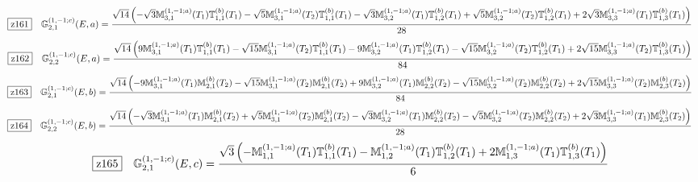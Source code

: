 \documentclass[fleqn,10pt,landscape]{jsarticle}
\begin{document}
\begin{dmath*}
\hspace*{3mm}\fbox{z161}\quad \mathbb{G}_{2,1}^{(1,-1;c)}(E,a)=\frac{\sqrt{14} \left(- \sqrt{3} \mathbb{M}_{3,1}^{(1,-1;a)}(T_{1}) \mathbb{T}_{1,1}^{(b)}(T_{1}) - \sqrt{5} \mathbb{M}_{3,1}^{(1,-1;a)}(T_{2}) \mathbb{T}_{1,1}^{(b)}(T_{1}) - \sqrt{3} \mathbb{M}_{3,2}^{(1,-1;a)}(T_{1}) \mathbb{T}_{1,2}^{(b)}(T_{1}) + \sqrt{5} \mathbb{M}_{3,2}^{(1,-1;a)}(T_{2}) \mathbb{T}_{1,2}^{(b)}(T_{1}) + 2 \sqrt{3} \mathbb{M}_{3,3}^{(1,-1;a)}(T_{1}) \mathbb{T}_{1,3}^{(b)}(T_{1})\right)}{28}
\end{dmath*}
\begin{dmath*}
\hspace*{3mm}\fbox{z162}\quad \mathbb{G}_{2,2}^{(1,-1;c)}(E,a)=\frac{\sqrt{14} \left(9 \mathbb{M}_{3,1}^{(1,-1;a)}(T_{1}) \mathbb{T}_{1,1}^{(b)}(T_{1}) - \sqrt{15} \mathbb{M}_{3,1}^{(1,-1;a)}(T_{2}) \mathbb{T}_{1,1}^{(b)}(T_{1}) - 9 \mathbb{M}_{3,2}^{(1,-1;a)}(T_{1}) \mathbb{T}_{1,2}^{(b)}(T_{1}) - \sqrt{15} \mathbb{M}_{3,2}^{(1,-1;a)}(T_{2}) \mathbb{T}_{1,2}^{(b)}(T_{1}) + 2 \sqrt{15} \mathbb{M}_{3,3}^{(1,-1;a)}(T_{2}) \mathbb{T}_{1,3}^{(b)}(T_{1})\right)}{84}
\end{dmath*}
\begin{dmath*}
\hspace*{3mm}\fbox{z163}\quad \mathbb{G}_{2,1}^{(1,-1;c)}(E,b)=\frac{\sqrt{14} \left(- 9 \mathbb{M}_{3,1}^{(1,-1;a)}(T_{1}) \mathbb{M}_{2,1}^{(b)}(T_{2}) - \sqrt{15} \mathbb{M}_{3,1}^{(1,-1;a)}(T_{2}) \mathbb{M}_{2,1}^{(b)}(T_{2}) + 9 \mathbb{M}_{3,2}^{(1,-1;a)}(T_{1}) \mathbb{M}_{2,2}^{(b)}(T_{2}) - \sqrt{15} \mathbb{M}_{3,2}^{(1,-1;a)}(T_{2}) \mathbb{M}_{2,2}^{(b)}(T_{2}) + 2 \sqrt{15} \mathbb{M}_{3,3}^{(1,-1;a)}(T_{2}) \mathbb{M}_{2,3}^{(b)}(T_{2})\right)}{84}
\end{dmath*}
\begin{dmath*}
\hspace*{3mm}\fbox{z164}\quad \mathbb{G}_{2,2}^{(1,-1;c)}(E,b)=\frac{\sqrt{14} \left(- \sqrt{3} \mathbb{M}_{3,1}^{(1,-1;a)}(T_{1}) \mathbb{M}_{2,1}^{(b)}(T_{2}) + \sqrt{5} \mathbb{M}_{3,1}^{(1,-1;a)}(T_{2}) \mathbb{M}_{2,1}^{(b)}(T_{2}) - \sqrt{3} \mathbb{M}_{3,2}^{(1,-1;a)}(T_{1}) \mathbb{M}_{2,2}^{(b)}(T_{2}) - \sqrt{5} \mathbb{M}_{3,2}^{(1,-1;a)}(T_{2}) \mathbb{M}_{2,2}^{(b)}(T_{2}) + 2 \sqrt{3} \mathbb{M}_{3,3}^{(1,-1;a)}(T_{1}) \mathbb{M}_{2,3}^{(b)}(T_{2})\right)}{28}
\end{dmath*}
\begin{dmath*}
\hspace*{3mm}\fbox{z165}\quad \mathbb{G}_{2,1}^{(1,-1;c)}(E,c)=\frac{\sqrt{3} \left(- \mathbb{M}_{1,1}^{(1,-1;a)}(T_{1}) \mathbb{T}_{1,1}^{(b)}(T_{1}) - \mathbb{M}_{1,2}^{(1,-1;a)}(T_{1}) \mathbb{T}_{1,2}^{(b)}(T_{1}) + 2 \mathbb{M}_{1,3}^{(1,-1;a)}(T_{1}) \mathbb{T}_{1,3}^{(b)}(T_{1})\right)}{6}
\end{dmath*}
\end{document}
